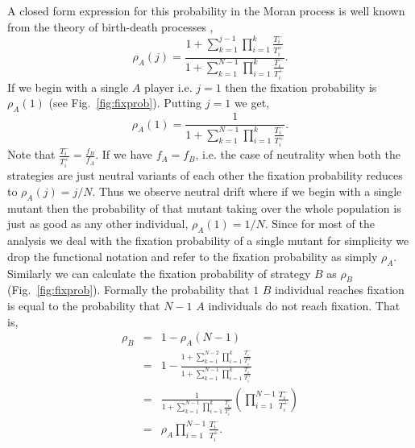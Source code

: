 \documentclass[oneside,11pt,a4paper]{book}
\begin{document}
A closed form expression for this probability in the Moran process is well known from the theory of birth-death processes \citep{goel:1974aa,nowak:2006bo,traulsen:2009bb},
%
\begin{equation}
\rho_A (j) = \frac{1 + \sum_{k=1}^{j-1} \prod_{i=1}^{k} \frac{T_i^-}{T_i^+}}{1 + \sum_{k=1}^{N-1} \prod_{i=1}^{k} \frac{T_i^-}{T_i^+}}.
\end{equation}
%
If we begin with a single $A$ player i.e. $j=1$ then the fixation probability is $\rho_A (1)$ (see Fig.\ \ref{fig:fixprob}).
Putting $j=1$ we get,
%
\begin{equation}
\rho_A (1) = \frac{1}{1 + \sum_{k=1}^{N-1} \prod_{i=1}^{k} \frac{T_i^-}{T_i^+}}.
\label{rhoa}
\end{equation}
%
Note that $\frac{T_i^-}{T_i^+} = \frac{f_B}{f_A}$. If we have $f_A = f_B$, i.e. the case of neutrality when both the strategies are just neutral variants of each other the fixation probability reduces to $\rho_A (j) = j/N$.
Thus we observe neutral drift where if we begin with a single mutant then the probability of that mutant taking over the whole population is just as good as any other individual, $\rho_A (1) = 1/N$.
Since for most of the analysis we deal with the fixation probability of a single mutant for simplicity we drop the functional notation and refer to the fixation probability as simply $\rho_A$.
Similarly we can calculate the fixation probability of strategy $B$ as $\rho_B$ (Fig.\ \ref{fig:fixprob}).
Formally the probability that $1$ $B$ individual reaches fixation is equal to the probability that $N-1$ $A$ individuals do not reach fixation.
That is,
%
\begin{eqnarray}
\rho_B &=& 1-\rho_A(N-1) \nonumber \\
&=& 1- \frac{1 + \sum_{k=1}^{N-2} \prod_{i=1}^{k} \frac{T_i^-}{T_i^+}}{1 + \sum_{k=1}^{N-1} \prod_{i=1}^{k} \frac{T_i^-}{T_i^+}} \nonumber \\
&=& \frac{1}{1 + \sum_{k=1}^{N-1} \prod_{i=1}^{k} \frac{T_i^-}{T_i^+}} \left(\prod_{i=1}^{N-1} \frac{T_i^-}{T_i^+}\right)\nonumber \\
&=&\rho_A \prod_{i=1}^{N-1} \frac{T_i^-}{T_i^+}.
\label{rhob}
\end{eqnarray}
%
%
\end{document}
